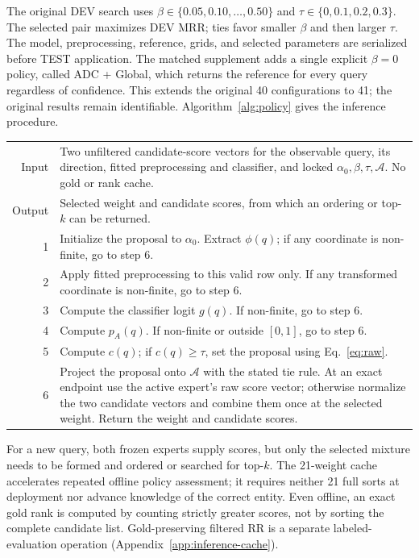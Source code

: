 \documentclass[11pt,a4paper]{article}
\newcommand{\Agrid}{\mathcal{A}}
\begin{document}
The original DEV search uses $\beta\in\{0.05,0.10,\ldots,0.50\}$ and $\tau\in\{0,0.1,0.2,0.3\}$. The selected pair maximizes DEV MRR; ties favor smaller $\beta$ and then larger $\tau$. The model, preprocessing, reference, grids, and selected parameters are serialized before TEST application. The matched supplement adds a single explicit $\beta=0$ policy, called ADC + Global, which returns the reference for every query regardless of confidence. This extends the original 40 configurations to 41; the original results remain identifiable. Algorithm~\ref{alg:policy} gives the inference procedure.

\begin{algorithm}[htbp]
\centering
\caption{Inference procedure for a locked ADC policy.}
\label{alg:policy}
\begin{tabularx}{\linewidth}{rX}
\toprule
Input & Two unfiltered candidate-score vectors for the observable query, its direction, fitted preprocessing and classifier, and locked $\alpha_0,\beta,\tau,\Agrid$. No gold or rank cache.\\
Output & Selected weight and candidate scores, from which an ordering or top-$k$ can be returned.\\
\midrule
1 & Initialize the proposal to $\alpha_0$. Extract $\phi(q)$; if any coordinate is non-finite, go to step 6.\\
2 & Apply fitted preprocessing to this valid row only. If any transformed coordinate is non-finite, go to step 6.\\
3 & Compute the classifier logit $g(q)$. If non-finite, go to step 6.\\
4 & Compute $p_A(q)$. If non-finite or outside $[0,1]$, go to step 6.\\
5 & Compute $c(q)$; if $c(q)\geq\tau$, set the proposal using Eq.~\eqref{eq:raw}.\\
6 & Project the proposal onto $\Agrid$ with the stated tie rule. At an exact endpoint use the active expert's raw score vector; otherwise normalize the two candidate vectors and combine them once at the selected weight. Return the weight and candidate scores.\\
\bottomrule
\end{tabularx}
\end{algorithm}

For a new query, both frozen experts supply scores, but only the selected mixture needs to be formed and ordered or searched for top-$k$. The 21-weight cache accelerates repeated offline policy assessment; it requires neither 21 full sorts at deployment nor advance knowledge of the correct entity. Even offline, an exact gold rank is computed by counting strictly greater scores, not by sorting the complete candidate list. Gold-preserving filtered RR is a separate labeled-evaluation operation (Appendix~\ref{app:inference-cache}).
\end{document}
